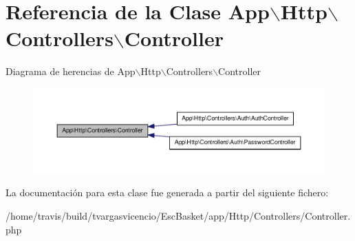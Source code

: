 \hypertarget{class_app_1_1_http_1_1_controllers_1_1_controller}{\section{\-Referencia de la \-Clase \-App$\backslash$\-Http$\backslash$\-Controllers$\backslash$\-Controller}
\label{class_app_1_1_http_1_1_controllers_1_1_controller}
}


\-Diagrama de herencias de \-App$\backslash$\-Http$\backslash$\-Controllers$\backslash$\-Controller
\nopagebreak
\begin{figure}[H]
\begin{center}
\leavevmode
\includegraphics[width=350pt]{class_app_1_1_http_1_1_controllers_1_1_controller__inherit__graph}
\end{center}
\end{figure}


\-La documentación para esta clase fue generada a partir del siguiente fichero\-:\begin{DoxyCompactItemize}
\item 
/home/travis/build/tvargasvicencio/\-Esc\-Basket/app/\-Http/\-Controllers/\-Controller.\-php\end{DoxyCompactItemize}
